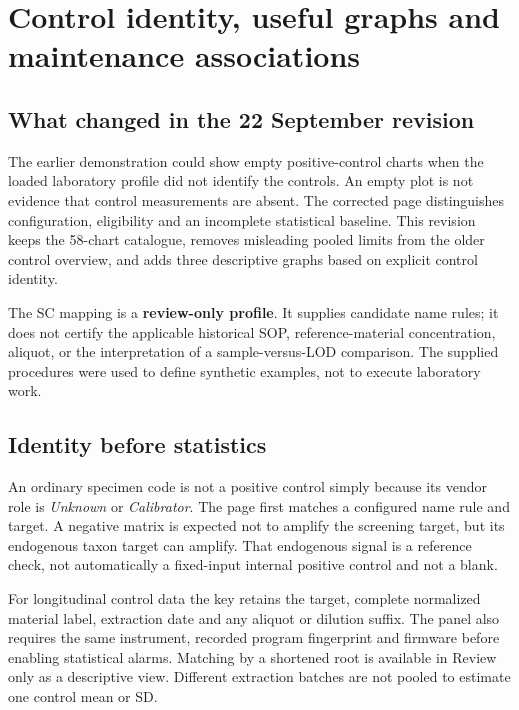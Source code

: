 \chapter{Control identity, useful graphs and maintenance associations}\label{ch:identity}

\section{What changed in the 22 September revision}
The earlier demonstration could show empty positive-control charts when the loaded laboratory profile did not identify
the controls. An empty plot is not evidence that control measurements are absent. The corrected page distinguishes
configuration, eligibility and an incomplete statistical baseline. This revision keeps the 58-chart catalogue, removes
misleading pooled limits from the older control overview, and adds three descriptive graphs based on explicit control identity.

\begin{infobox}
The SC mapping is a \textbf{review-only profile}. It supplies candidate name rules; it does not certify the applicable
historical SOP, reference-material concentration, aliquot, or the interpretation of a sample-versus-LOD comparison.
The supplied procedures were used to define synthetic examples, not to execute laboratory work.
\end{infobox}

\section{Identity before statistics}
An ordinary specimen code is not a positive control simply because its vendor role is \emph{Unknown} or \emph{Calibrator}.
The page first matches a configured name rule and target. A negative matrix is expected not to amplify the screening target,
but its endogenous taxon target can amplify. That endogenous signal is a reference check, not automatically a fixed-input
internal positive control and not a blank.

For longitudinal control data the key retains the target, complete normalized material label, extraction date and any
aliquot or dilution suffix. The panel also requires the same instrument, recorded program fingerprint and firmware before
enabling statistical alarms. Matching by a shortened root is available in Review only as a descriptive view.
Different extraction batches are not pooled to estimate one control mean or SD.

